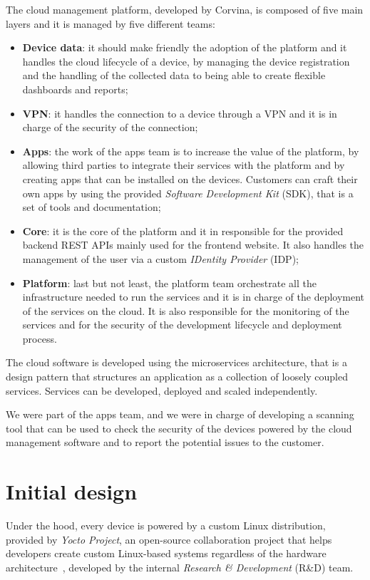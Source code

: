 The cloud management platform, developed by Corvina, is composed of five main layers and it is managed by five different teams:
\begin{itemize}
  \item \textbf{Device data}: it should make friendly the adoption of the platform and it handles the cloud lifecycle of a device, by managing the device registration and the handling of the collected data to being able to create flexible dashboards and reports;
  \item \textbf{VPN}: it handles the connection to a device through a VPN and it is in charge of the security of the connection;
  \item \textbf{Apps}: the work of the apps team is to increase the value of the platform, by allowing third parties to integrate their services with the platform and by creating apps that can be installed on the devices. Customers can craft their own apps by using the provided \textit{Software Development Kit} (SDK), that is a set of tools and documentation;
  \item \textbf{Core}: it is the core of the platform and it in responsible for the provided backend REST APIs mainly used for the frontend website. It also handles the management of the user via a custom \textit{IDentity Provider} (IDP);
  \item \textbf{Platform}: last but not least, the platform team orchestrate all the infrastructure needed to run the services and it is in charge of the deployment of the services on the cloud. It is also responsible for the monitoring of the services and for the security of the development lifecycle and deployment process.
\end{itemize}

The cloud software is developed using the microservices architecture, that is a design pattern that structures an application as a collection of loosely coupled services. Services can be developed, deployed and scaled independently.

We were part of the apps team, and we were in charge of developing a scanning tool that can be used to check the security of the devices powered by the cloud management software and to report the potential issues to the customer.

\section{Initial design}

Under the hood, every device is powered by a custom Linux distribution, provided by \textit{Yocto Project}, an open-source collaboration project that helps developers create custom Linux-based systems regardless of the hardware architecture~\cite{yocto-project}, developed by the internal \textit{Research \& Development} (R\&D) team.

